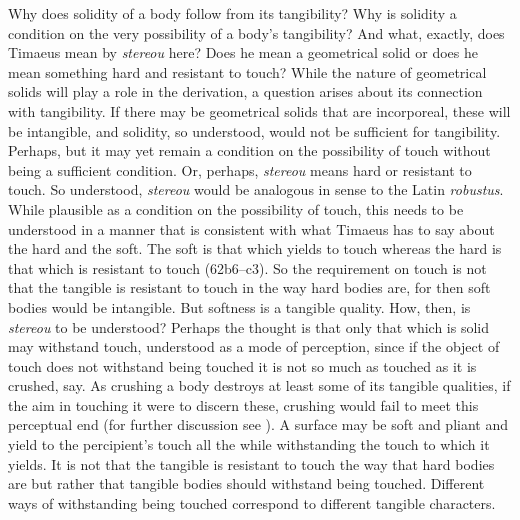 Why does solidity of a body follow from its tangibility? Why is solidity a condition on the very possibility of a body's tangibility? And what, exactly, does Timaeus mean by \emph{stereou} here? Does he mean a geometrical solid or does he mean something hard and resistant to touch? While the nature of geometrical solids will play a role in the derivation, a question arises about its connection with tangibility. If there may be geometrical solids that are incorporeal, these will be intangible, and solidity, so understood, would not be sufficient for tangibility. Perhaps, but it may yet remain a condition on the possibility of touch without being a sufficient condition. Or, perhaps, \emph{stereou} means hard or resistant to touch. So understood, \emph{stereou} would be analogous in sense to the Latin \emph{robustus}. While plausible as a condition on the possibility of touch, this needs to be understood in a manner that is consistent with what Timaeus has to say about the hard and the soft. The soft is that which yields to touch whereas the hard is that which is resistant to touch (62b6–c3). So the requirement on touch is not that the tangible is resistant to touch in the way hard bodies are, for then soft bodies would be intangible. But softness is a tangible quality. How, then, is \emph{stereou} to be understood? Perhaps the thought is that only that which is solid may withstand touch, understood as a mode of perception, since if the object of touch does not withstand being touched it is not so much as touched as it is crushed, say. As crushing a body destroys at least some of its tangible qualities, if the aim in touching it were to discern these, crushing would fail to meet this perceptual end (for further discussion see \citealt[59--60]{Kalderon:2018oe}). A surface may be soft and pliant and yield to the percipient's touch all the while withstanding the touch to which it yields. It is not that the tangible is resistant to touch the way that hard bodies are but rather that tangible bodies should withstand being touched. Different ways of withstanding being touched correspond to different tangible characters.

